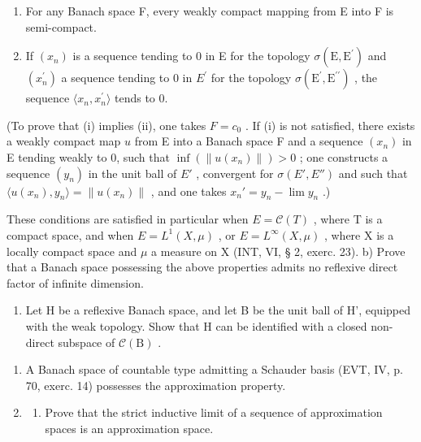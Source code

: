 \begin{enumerate}
\def\labelenumi{(\roman{enumi})}
\item
  For any Banach space F, every weakly compact mapping from E into F is semi-compact.
\item
  If \((x_{n})\) is a sequence tending to 0 in E for the topology \(\sigma(\mathrm{E},\mathrm{E}^{\prime})\) and \((x_{n}^{\prime})\) a sequence tending to 0 in \(E^{\prime}\) for the topology \(\sigma(\mathrm{E}^{\prime},\mathrm{E}^{\prime\prime})\) , the sequence \(\langle x_{n},x_{n}^{\prime}\rangle\) tends to 0.
\end{enumerate}

(To prove that (i) implies (ii), one takes \(F = c_0\) . If (i) is not satisfied, there exists a weakly compact map \(u\) from E into a Banach space F and a sequence \((x_n)\) in E tending weakly to 0, such that \(\inf(\|u(x_n)\|) > 0\) ; one constructs a sequence \((y_n)\) in the unit ball of \(E'\) , convergent for \(\sigma(E', E'')\) and such that \(\langle u(x_n), y_n \rangle = \|u(x_n)\|\) , and one takes \(x_n' = y_n - \lim y_n\) .)

These conditions are satisfied in particular when \(E = \mathcal{C}(T)\) , where T is a compact space, and when \(E = L^{1}(X, \mu)\) , or \(E = L^{\infty}(X, \mu)\) , where X is a locally compact space and \(\mu\) a measure on X (INT, VI, § 2, exerc. 23). b) Prove that a Banach space possessing the above properties admits no reflexive direct factor of infinite dimension.

\begin{enumerate}
\def\labelenumi{\alph{enumi})}
\setcounter{enumi}{2}
\tightlist
\item
  Let H be a reflexive Banach space, and let B be the unit ball of H', equipped with the weak topology. Show that H can be identified with a closed non-direct subspace of \(\mathcal{C}(\mathrm{B})\) .
\end{enumerate}

\begin{enumerate}
\def\labelenumi{\arabic{enumi})}
\setcounter{enumi}{31}
\item
  A Banach space of countable type admitting a Schauder basis (EVT, IV, p. 70, exerc. 14) possesses the approximation property.
\item
  \begin{enumerate}
  \def\labelenumii{\alph{enumii})}
  \tightlist
  \item
    Prove that the strict inductive limit of a sequence of approximation spaces is an approximation space.
  \end{enumerate}
\end{enumerate}

